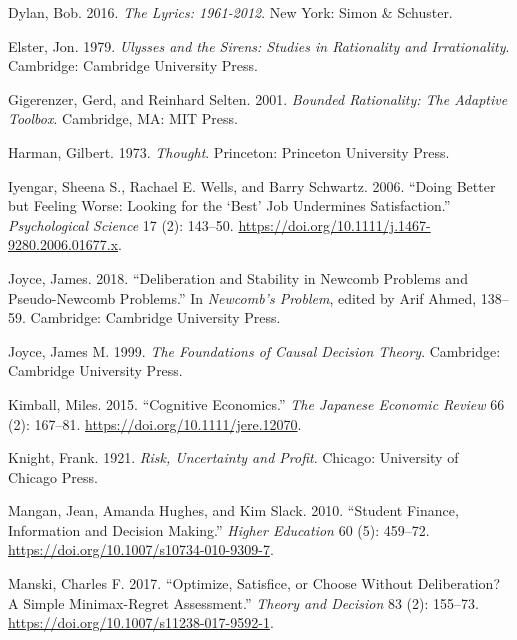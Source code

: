 \documentclass[
  12pt,
]{article}
\newlength{\cslhangindent}
\newlength{\cslentryspacingunit} %
\newenvironment{CSLReferences}[2] %
 {%
  \setlength{\parindent}{0pt}
  \ifodd #1
  \let\oldpar\par
  \def\par{\hangindent=\cslhangindent\oldpar}
  \fi
  \setlength{\parskip}{#2\cslentryspacingunit}
 }%
 {}
\begin{document}
\begin{CSLReferences}{1}{0}
\leavevmode{}%
Dylan, Bob. 2016. \emph{The Lyrics: 1961-2012}. New York: Simon \& Schuster.

\leavevmode{}%
Elster, Jon. 1979. \emph{Ulysses and the Sirens: Studies in Rationality and Irrationality}. Cambridge: Cambridge University Press.

\leavevmode{}%
Gigerenzer, Gerd, and Reinhard Selten. 2001. \emph{Bounded Rationality: The Adaptive Toolbox}. Cambridge, MA: MIT Press.

\leavevmode{}%
Harman, Gilbert. 1973. \emph{Thought}. Princeton: Princeton University Press.

\leavevmode{}%
Iyengar, Sheena S., Rachael E. Wells, and Barry Schwartz. 2006. {``Doing Better but Feeling Worse: Looking for the {`Best'} Job Undermines Satisfaction.''} \emph{Psychological Science} 17 (2): 143--50. \url{https://doi.org/10.1111/j.1467-9280.2006.01677.x}.

\leavevmode{}%
Joyce, James. 2018. {``Deliberation and Stability in Newcomb Problems and Pseudo-Newcomb Problems.''} In \emph{Newcomb's Problem}, edited by Arif Ahmed, 138--59. Cambridge: Cambridge University Press.

\leavevmode{}%
Joyce, James M. 1999. \emph{The Foundations of Causal Decision Theory}. Cambridge: Cambridge University Press.

\leavevmode{}%
Kimball, Miles. 2015. {``Cognitive Economics.''} \emph{The Japanese Economic Review} 66 (2): 167--81. \url{https://doi.org/10.1111/jere.12070}.

\leavevmode{}%
Knight, Frank. 1921. \emph{Risk, Uncertainty and Profit}. Chicago: University of Chicago Press.

\leavevmode{}%
Mangan, Jean, Amanda Hughes, and Kim Slack. 2010. {``Student Finance, Information and Decision Making.''} \emph{Higher Education} 60 (5): 459--72. \url{https://doi.org/10.1007/s10734-010-9309-7}.

\leavevmode{}%
Manski, Charles F. 2017. {``Optimize, Satisfice, or Choose Without Deliberation? A Simple Minimax-Regret Assessment.''} \emph{Theory and Decision} 83 (2): 155--73. \url{https://doi.org/10.1007/s11238-017-9592-1}.


\end{CSLReferences}
\end{document}
